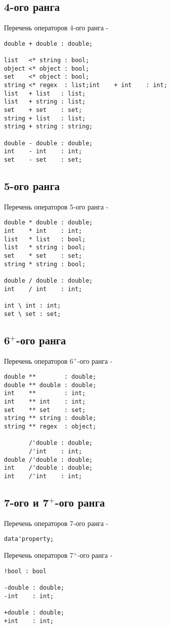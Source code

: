 \subsection{4-ого ранга}

\noindent Перечень операторов 4-ого ранга -
\begin{lstlisting}[numbers=none]
double + double : double;

list   <* string : bool;
object <* object : bool;
set    <* object : bool;
string <* regex  : list;int    + int    : int;
list   + list   : list;
list   + string : list;
set    + set    : set;
string + list   : list;
string + string : string;

double - double : double;
int    - int    : int;
set    - set    : set;
\end{lstlisting}

\subsection{5-ого ранга}

\noindent Перечень операторов 5-ого ранга -
\begin{lstlisting}[numbers=none]
double * double : double;
int    * int    : int;
list   * list   : bool;
list   * string : bool;
set    * set    : set;
string * string : bool;

double / double : double;
int    / int    : int;

int \ int : int;
set \ set : set;
\end{lstlisting}

\subsection{6$^+$-ого ранга}

\noindent Перечень операторов 6$^+$-ого ранга -
\begin{lstlisting}[numbers=none]
double **        : double;
double ** double : double;
int    **        : int;
int    ** int    : int;
set    ** set    : set;
string ** string : double;
string ** regex  : object;

       /'double : double;
       /'int    : int;
double /'double : double;
int    /'double : double;
int    /'int    : int;
\end{lstlisting}

\subsection{7-ого и 7$^+$-ого ранга}

\noindent Перечень операторов 7-ого ранга -
\begin{lstlisting}[numbers=none]
data'property;
\end{lstlisting}

\noindent Перечень операторов 7$^+$-ого ранга -
\begin{lstlisting}[numbers=none]
!bool : bool

-double : double;
-int    : int;

+double : double;
+int    : int;
\end{lstlisting}

